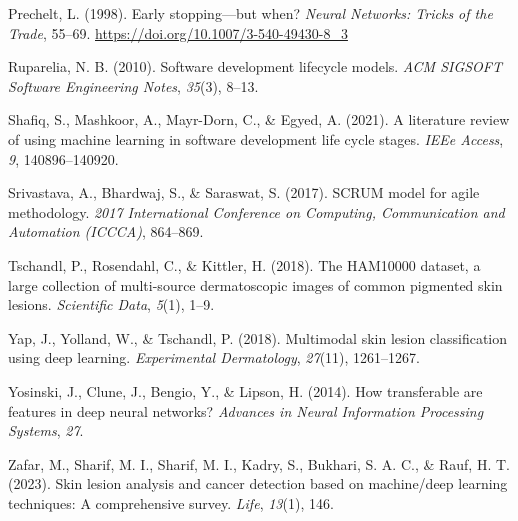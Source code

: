 \documentclass[
  12pt,
  oneside]{article}
\newlength{\cslhangindent}
\newenvironment{CSLReferences}[2] %
 {\begin{list}{}{%
  \setlength{\itemindent}{0pt}
  \setlength{\leftmargin}{0pt}
  \setlength{\parsep}{0pt}
  \ifodd #1
   \setlength{\leftmargin}{\cslhangindent}
   \setlength{\itemindent}{-1\cslhangindent}
  \fi
  \setlength{\itemsep}{#2\baselineskip}}}
 {\end{list}}
\begin{document}
\begin{CSLReferences}{1}{0}
Prechelt, L. (1998). Early stopping---but when? \emph{Neural Networks:
Tricks of the Trade}, 55--69.
\url{https://doi.org/10.1007/3-540-49430-8_3}

Ruparelia, N. B. (2010). Software development lifecycle models.
\emph{ACM SIGSOFT Software Engineering Notes}, \emph{35}(3), 8--13.

Shafiq, S., Mashkoor, A., Mayr-Dorn, C., \& Egyed, A. (2021). A
literature review of using machine learning in software development life
cycle stages. \emph{IEEe Access}, \emph{9}, 140896--140920.

Srivastava, A., Bhardwaj, S., \& Saraswat, S. (2017). SCRUM model for
agile methodology. \emph{2017 International Conference on Computing,
Communication and Automation (ICCCA)}, 864--869.

Tschandl, P., Rosendahl, C., \& Kittler, H. (2018). The HAM10000
dataset, a large collection of multi-source dermatoscopic images of
common pigmented skin lesions. \emph{Scientific Data}, \emph{5}(1),
1--9.

Yap, J., Yolland, W., \& Tschandl, P. (2018). Multimodal skin lesion
classification using deep learning. \emph{Experimental Dermatology},
\emph{27}(11), 1261--1267.

Yosinski, J., Clune, J., Bengio, Y., \& Lipson, H. (2014). How
transferable are features in deep neural networks? \emph{Advances in
Neural Information Processing Systems}, \emph{27}.

Zafar, M., Sharif, M. I., Sharif, M. I., Kadry, S., Bukhari, S. A. C.,
\& Rauf, H. T. (2023). Skin lesion analysis and cancer detection based
on machine/deep learning techniques: A comprehensive survey.
\emph{Life}, \emph{13}(1), 146.

\end{CSLReferences}
\end{document}

